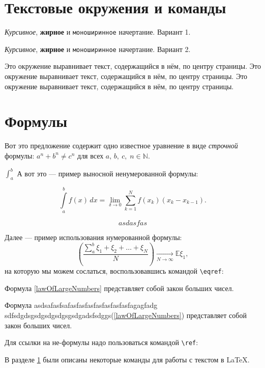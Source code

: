 \documentclass[a4paper,12pt]{article}
\begin{document}
\section{Текстовые окружения и команды}\label{textInfo}

\textit{Курсивное}, \textbf{жирное} и \texttt{моноширинное} начертание. Вариант 1.

{\it Курсивное}, {\bf жирное} и {\tt моноширинное} начертание. Вариант 2.

\begin{center}
 Это окружение выравнивает текст, содержащийся в нём, по центру страницы. Это окружение выравнивает текст, содержащийся в нём, по центру страницы. Это окружение выравнивает текст, содержащийся в нём, по центру страницы.
\end{center}


\section{Формулы}

Вот это предложение содержит одно известное уравнение в виде \textit{строчной} формулы: $a^n+b^n\neq c^n$ для всех $a,\,b,\ c,\; n\in \mathbb{N}$.

$\int_a^b$ А вот это --- пример выносной ненумерованной формулы:

$$
\int\limits_a^bf(x)\,dx = \lim\limits_{\delta\to0}\sum\limits_{k=1}^{N}f(x_k)(x_k - x_{k-1}).
$$

\begin{equation}
asdasfas	
\end{equation}

Далее --- пример использования нумерованной формулы:
\begin{equation}\label{lawOfLargeNumbers}
 \left(\dfrac{\sum\limits_a^b\xi_1 + \xi_2 + \dots + \xi_N}{N}\right) \xrightarrow[N\to\infty]{} \mathbb{E}\xi_1,
\end{equation}
на которую мы можем сослаться, воспользовавшись командой \verb:\eqref:: 

Формула \eqref{lawOfLargeNumbers} представляет собой закон больших чисел.


Формула asdsafasfsafasfasfasfasfasfasfasfagagfadg sdfsdgdsgsdgsdgsdgsgsdgadsfsdggs(\ref{lawOfLargeNumbers}) представляет собой закон больших чисел.


Для ссылки на не-формулы надо пользоваться командой \verb:\ref::

В разделе \ref{textInfo} были описаны некоторые команды для работы с текстом в \LaTeX.
\end{document}
